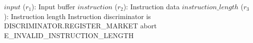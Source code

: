 \begin{algorithm}
\caption{RegisterMarket}
\begin{algorithmic}
\INPUT $input$ ($r_1$): Input buffer
\INPUT $instruction$ ($r_2$): Instruction data
\INPUT $instruction\_length$ ($r_3$): Instruction length
\REQUIRE Instruction discriminator is DISCRIMINATOR.REGISTER\_MARKET
\STATE abort E\_INVALID\_INSTRUCTION\_LENGTH
\ENDIF
\ENDPROCEDURE
\end{algorithmic}
\end{algorithm}
